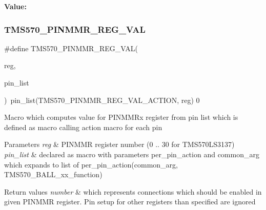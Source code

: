 {\bfseries Value\+:}
\begin{DoxyCode}{0}
\DoxyCodeLine{  )}

\end{DoxyCode}
\mbox{\label{tms570-pinmux_8h_a8c716a1464fdfd7aa36e422ab8ee2278}} 
\subsubsection{\texorpdfstring{TMS570\_PINMMR\_REG\_VAL}{TMS570\_PINMMR\_REG\_VAL}}
{\footnotesize\ttfamily \#define T\+M\+S570\+\_\+\+P\+I\+N\+M\+M\+R\+\_\+\+R\+E\+G\+\_\+\+V\+AL(\begin{DoxyParamCaption}\item[{}]{reg,  }\item[{}]{pin\+\_\+list }\end{DoxyParamCaption})~pin\+\_\+list(T\+M\+S570\+\_\+\+P\+I\+N\+M\+M\+R\+\_\+\+R\+E\+G\+\_\+\+V\+A\+L\+\_\+\+A\+C\+T\+I\+ON, reg) 0}

Macro which computes value for P\+I\+N\+M\+M\+Rx register from pin list which is defined as macro calling action macro for each pin


\begin{DoxyParams}{Parameters}
{\em reg} & P\+I\+N\+M\+MR register number (0 .. 30 for T\+M\+S570\+L\+S3137) \\
\hline
{\em pin\+\_\+list} & declared as macro with parameters {\ttfamily per\+\_\+pin\+\_\+action} and {\ttfamily common\+\_\+arg} which expands to list of {\ttfamily per\+\_\+pin\+\_\+action}({\ttfamily common\+\_\+arg}, {\ttfamily T\+M\+S570\+\_\+\+B\+A\+L\+L\+\_\+xx\+\_\+function})\\
\hline
\end{DoxyParams}

\begin{DoxyRetVals}{Return values}
{\em number} & which represents connections which should be enabled in given P\+I\+N\+M\+MR register. Pin setup for other registers than specified are ignored \\
\hline
\end{DoxyRetVals}
\mbox{\label{tms570-pinmux_8h_a2efa0925e0c4e318a6953bde89583966}} 
